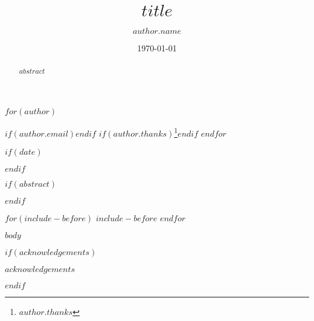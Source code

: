 \documentclass[$for(classoption)$$classoption$$sep$,$endfor$]{JASA}
\begin{document}

\title[$if(shorttitle)$$shorttitle$$endif$]{$title$}



$for(author)$
\author{$author.name$}
$if(author.email)$$endif$
$if(author.thanks)$\thanks{$author.thanks$}$endif$
$endfor$




$if(date)$\date{\today}$endif$

$if(abstract)$
\begin{abstract}
$abstract$
\end{abstract}
$endif$


\maketitle



$for(include-before)$
$include-before$
$endfor$

$body$

$if(acknowledgements)$
\begin{acknowledgments}
$acknowledgements$
\end{acknowledgments}
$endif$
\end{document}

